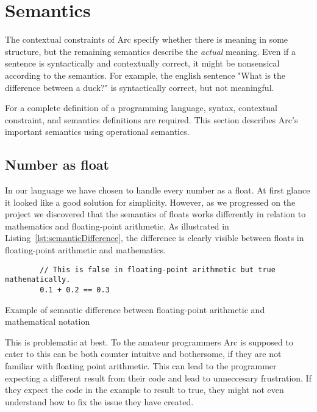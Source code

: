\section{Semantics}\label{sec:languagesemantics}
The contextual constraints of Arc specify whether there is meaning in some structure, but the remaining semantics describe the \textit{actual} meaning. Even if a sentence is syntactically and contextually correct, it might be nonsensical according to the semantics. For example, the english sentence "What is the difference between a duck?" is syntactically correct, but not meaningful.

For a complete definition of a programming language, syntax, contextual constraint, and semantics definitions are required. This section describes Arc's important semantics using operational semantics.


\subsection{Number as float}\label{subsec:numberAsFloats}
In our language we have chosen to handle every number as a float. At first glance it looked like a good solution for simplicity. However, as we progressed on the project we discovered that the semantics of floats works differently in relation to mathematics and floating-point arithmetic. As illustrated in Listing~\ref{lst:semanticDifference}, the difference is clearly visible between floats in floating-point arithmetic and mathematics.


\begin{listing}[htb!]
    \begin{verbatim}
        // This is false in floating-point arithmetic but true mathematically.
        0.1 + 0.2 == 0.3
    \end{verbatim}
    \caption{Example of semantic difference between floating-point arithmetic and mathematical notation}
    \label{lst:semanticDifference}
\end{listing}


This is problematic at best. To the amateur programmers Arc is supposed to cater to this can be both counter intuitve and bothersome, if they are not familiar with floating point arithmetic. This can lead to the programmer expecting a different result from their code and lead to unneccesary frustration. If they expect the code in the example to result to true, they might not even understand how to fix the issue they have created.

